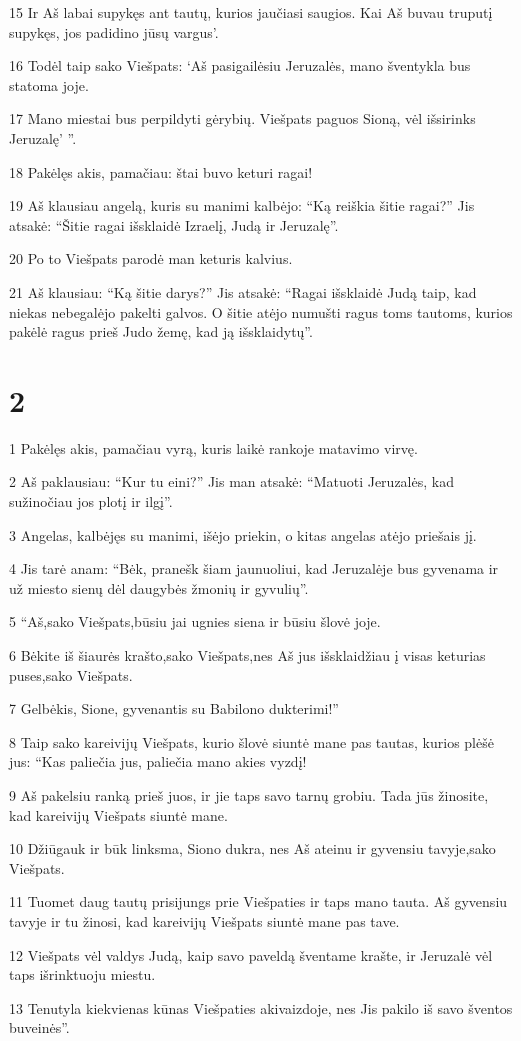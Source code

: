 \par 15 Ir Aš labai supykęs ant tautų, kurios jaučiasi saugios. Kai Aš buvau truputį supykęs, jos padidino jūsų vargus’. 
\par 16 Todėl taip sako Viešpats: ‘Aš pasigailėsiu Jeruzalės, mano šventykla bus statoma joje. 
\par 17 Mano miestai bus perpildyti gėrybių. Viešpats paguos Sioną, vėl išsirinks Jeruzalę’ ”. 
\par 18 Pakėlęs akis, pamačiau: štai buvo keturi ragai! 
\par 19 Aš klausiau angelą, kuris su manimi kalbėjo: “Ką reiškia šitie ragai?” Jis atsakė: “Šitie ragai išsklaidė Izraelį, Judą ir Jeruzalę”. 
\par 20 Po to Viešpats parodė man keturis kalvius. 
\par 21 Aš klausiau: “Ką šitie darys?” Jis atsakė: “Ragai išsklaidė Judą taip, kad niekas nebegalėjo pakelti galvos. O šitie atėjo numušti ragus toms tautoms, kurios pakėlė ragus prieš Judo žemę, kad ją išsklaidytų”.


\chapter{2}


\par 1 Pakėlęs akis, pamačiau vyrą, kuris laikė rankoje matavimo virvę. 
\par 2 Aš paklausiau: “Kur tu eini?” Jis man atsakė: “Matuoti Jeruzalės, kad sužinočiau jos plotį ir ilgį”. 
\par 3 Angelas, kalbėjęs su manimi, išėjo priekin, o kitas angelas atėjo priešais jį. 
\par 4 Jis tarė anam: “Bėk, pranešk šiam jaunuoliui, kad Jeruzalėje bus gyvenama ir už miesto sienų dėl daugybės žmonių ir gyvulių”. 
\par 5 “Aš,­sako Viešpats,­būsiu jai ugnies siena ir būsiu šlovė joje. 
\par 6 Bėkite iš šiaurės krašto,­sako Viešpats,­nes Aš jus išsklaidžiau į visas keturias puses,­sako Viešpats.­ 
\par 7 Gelbėkis, Sione, gyvenantis su Babilono dukterimi!” 
\par 8 Taip sako kareivijų Viešpats, kurio šlovė siuntė mane pas tautas, kurios plėšė jus: “Kas paliečia jus, paliečia mano akies vyzdį! 
\par 9 Aš pakelsiu ranką prieš juos, ir jie taps savo tarnų grobiu. Tada jūs žinosite, kad kareivijų Viešpats siuntė mane. 
\par 10 Džiūgauk ir būk linksma, Siono dukra, nes Aš ateinu ir gyvensiu tavyje,­sako Viešpats.­ 
\par 11 Tuomet daug tautų prisijungs prie Viešpaties ir taps mano tauta. Aš gyvensiu tavyje ir tu žinosi, kad kareivijų Viešpats siuntė mane pas tave. 
\par 12 Viešpats vėl valdys Judą, kaip savo paveldą šventame krašte, ir Jeruzalė vėl taps išrinktuoju miestu. 
\par 13 Tenutyla kiekvienas kūnas Viešpaties akivaizdoje, nes Jis pakilo iš savo šventos buveinės”.



